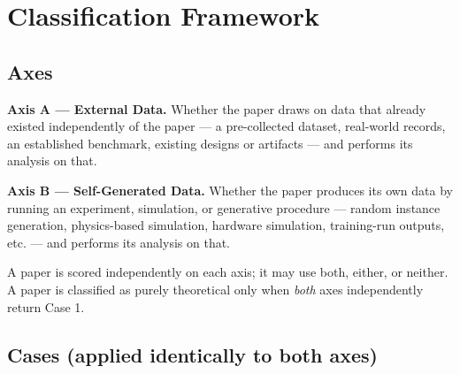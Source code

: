 \section{Classification Framework}
\label{sec:framework}

\subsection{Axes}

\textbf{Axis A --- External Data.} Whether the paper draws on data that already existed
independently of the paper --- a pre-collected dataset, real-world records, an
established benchmark, existing designs or artifacts --- and performs its analysis on
that.

\textbf{Axis B --- Self-Generated Data.} Whether the paper produces its own data by
running an experiment, simulation, or generative procedure --- random instance
generation, physics-based simulation, hardware simulation, training-run outputs, etc.
--- and performs its analysis on that.

A paper is scored independently on each axis; it may use both, either, or neither. A
paper is classified as purely theoretical only when \emph{both} axes independently
return Case 1.

\subsection{Cases (applied identically to both axes)}

